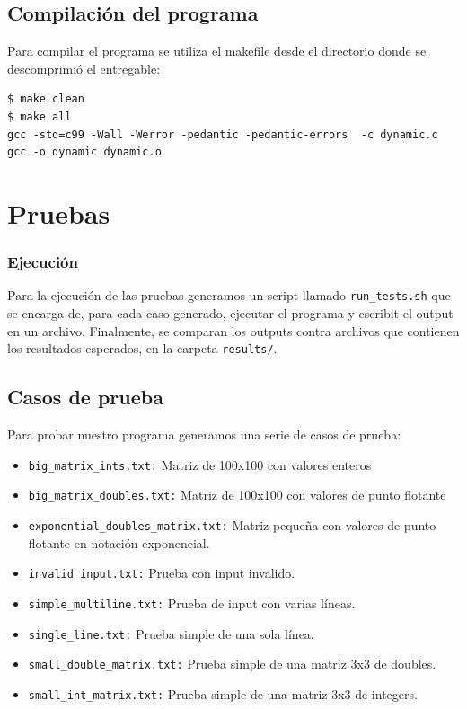 \documentclass[a4paper,10pt, spanish]{article}
\begin{document}



\lstset{
  language=bash,
  basicstyle=\small\ttfamily
}

\subsection{Compilación del programa}
Para compilar el programa se utiliza el makefile desde el directorio donde se descomprimió el entregable:
\begin{lstlisting}
$ make clean
$ make all
gcc -std=c99 -Wall -Werror -pedantic -pedantic-errors  -c dynamic.c
gcc -o dynamic dynamic.o

\end{lstlisting}

\section{Pruebas}

\subsubsection{Ejecución}

Para la ejecución de las pruebas generamos un script llamado \lstinline{run_tests.sh} que se encarga de, para cada caso generado, ejecutar el programa y escribit el output en un archivo.
Finalmente, se comparan los outputs contra archivos que contienen los resultados esperados, en la carpeta \lstinline{results/}.

\subsection{Casos de prueba}

Para probar nuestro programa generamos una serie de casos de prueba:

\begin{itemize}
  \item \lstinline{big_matrix_ints.txt:} Matriz de 100x100 con valores enteros
	\item \lstinline{big_matrix_doubles.txt:} Matriz de 100x100 con valores de punto flotante
  \item \lstinline{exponential_doubles_matrix.txt:} Matriz pequeña con valores de punto flotante en notación exponencial.
  \item \lstinline{invalid_input.txt:} Prueba con input invalido.
  \item \lstinline{simple_multiline.txt:} Prueba de input con varias líneas.
  \item \lstinline{single_line.txt:} Prueba simple de una sola línea.
  \item \lstinline{small_double_matrix.txt:} Prueba simple de una matriz 3x3 de doubles.
  \item \lstinline{small_int_matrix.txt:} Prueba simple de una matriz 3x3 de integers.
\end{itemize}
\end{document}
